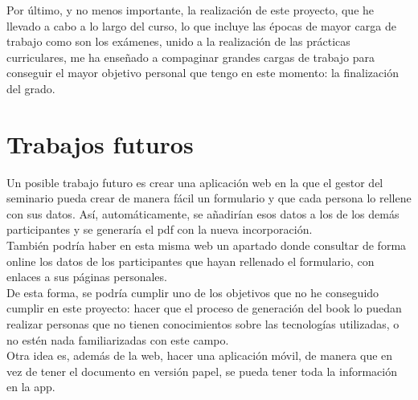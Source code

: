 \documentclass[a4paper, 12pt]{book}
\begin{document}
Por último, y no menos importante, la realización de este proyecto, que he llevado a cabo a lo largo del curso, lo que incluye las épocas de mayor carga de trabajo como son los exámenes, unido a la realización de las prácticas curriculares, me ha enseñado a compaginar grandes cargas de trabajo para conseguir el mayor objetivo personal que tengo en este momento: la finalización del grado.


\section{Trabajos futuros}
\label{sec:trabajos_futuros}
Un posible trabajo futuro es crear una aplicación web en la que el gestor del seminario pueda crear de manera fácil un formulario y que cada persona lo rellene con sus datos. Así, automáticamente, se añadirían esos datos a los de los demás participantes y se generaría el pdf con la nueva incorporación.\\

También podría haber en esta misma web un apartado donde consultar de forma online los datos de los participantes que hayan rellenado el formulario, con enlaces a sus páginas personales.\\

De esta forma, se podría cumplir uno de los objetivos que no he conseguido cumplir en este proyecto: hacer que el proceso de generación del book lo puedan realizar personas que no tienen conocimientos sobre las tecnologías utilizadas, o no estén nada familiarizadas con este campo.\\

Otra idea es, además de la web, hacer una aplicación móvil, de manera que en vez de tener el documento en versión papel, se pueda tener toda la información en la app.




\cleardoublepage

%


\end{document}
